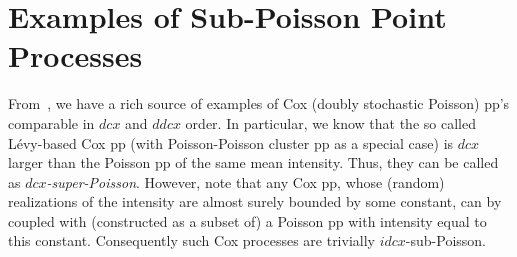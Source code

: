 \documentclass[conference]{IEEEtran}
\begin{document}
\section{Examples of Sub-Poisson Point Processes}
\label{s.Examples}

From~\cite[Section~5.2, 5.3]{snorder}, we have a rich source of examples of
Cox (doubly stochastic Poisson) pp's
comparable in $dcx$ and $ddcx$ order. 
In particular, we know that the so called L\'evy-based Cox pp 
(with Poisson-Poisson cluster pp as a special case) 
is $dcx$ larger than the Poisson pp of the same mean intensity.
Thus, they can be called as {\em $dcx$-super-Poisson}. 
However, note that any Cox pp, whose (random) realizations
of the intensity are almost surely bounded by some constant, 
can by coupled with (constructed as a subset of) 
a Poisson pp with intensity equal to
this constant. Consequently such Cox processes are trivially 
$idcx$-sub-Poisson.
\end{document}
